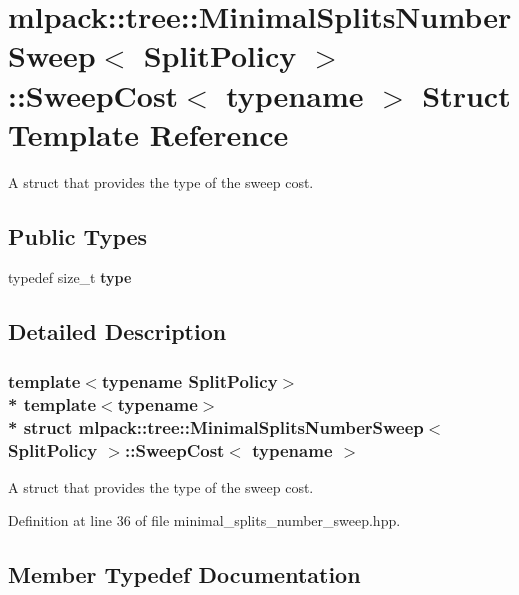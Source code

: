 \section{mlpack\+:\+:tree\+:\+:Minimal\+Splits\+Number\+Sweep$<$ Split\+Policy $>$\+:\+:Sweep\+Cost$<$ typename $>$ Struct Template Reference}
\label{structmlpack_1_1tree_1_1MinimalSplitsNumberSweep_1_1SweepCost}


A struct that provides the type of the sweep cost.  


\subsection*{Public Types}
\begin{DoxyCompactItemize}
\item 
typedef size\+\_\+t {\bf type}
\end{DoxyCompactItemize}


\subsection{Detailed Description}
\subsubsection*{template$<$typename Split\+Policy$>$\\*
template$<$typename$>$\\*
struct mlpack\+::tree\+::\+Minimal\+Splits\+Number\+Sweep$<$ Split\+Policy $>$\+::\+Sweep\+Cost$<$ typename $>$}

A struct that provides the type of the sweep cost. 

Definition at line 36 of file minimal\+\_\+splits\+\_\+number\+\_\+sweep.\+hpp.



\subsection{Member Typedef Documentation}
